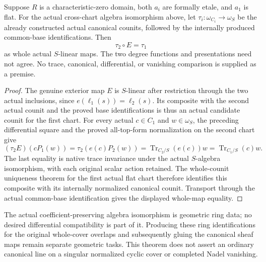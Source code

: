 \begin{theorem}
\label{thm:kn-nadel-cross-chart-canonical-counit}
\leanok
Suppose $R$ is a characteristic-zero domain, both $a_i$ are formally
etale, and $a_1$ is flat.  For the actual cross-chart algebra
isomorphism above, let $\tau_i:\omega_{C_i}\to\omega_S$ be the
already constructed actual canonical counits, followed by the
internally produced common-base identifications.  Then
\[
 \tau_2\circ E=\tau_1
\]
as whole actual $S$-linear maps.  The two degree functions and
presentations need not agree.  No trace, canonical, differential,
or vanishing comparison is supplied as a premise.
\end{theorem}
\begin{proof}
The genuine exterior map $E$ is $S$-linear after restriction through
the two actual inclusions, since $e(\ell_1(s))=\ell_2(s)$.  Its
composite with the second actual counit and the proved base
identifications is thus an actual candidate counit for the first
chart.  For every actual $c\in C_1$ and $w\in\omega_S$, the
preceding differential square and the proved all-top-form
normalization on the second chart give
\[
 (\tau_2 E)(cP_1(w))
   =\tau_2(e(c)P_2(w))
   =\operatorname{Tr}_{C_2/S}(e(c))w
   =\operatorname{Tr}_{C_1/S}(c)w.
\]
The last equality is native trace invariance under the actual
$S$-algebra isomorphism, with each original scalar action retained.
The whole-counit uniqueness theorem for the first actual flat chart
therefore identifies this composite with its internally normalized
canonical counit.  Transport through the actual common-base
identification gives the displayed whole-map equality.
\end{proof}

The actual coefficient-preserving algebra isomorphism is geometric
ring data; no desired differential compatibility is part of it.
Producing these ring identifications for the original whole-cover
overlaps and subsequently gluing the canonical sheaf maps remain
separate geometric tasks.  This theorem does not assert an ordinary
canonical line on a singular normalized cyclic cover or completed
Nadel vanishing.
